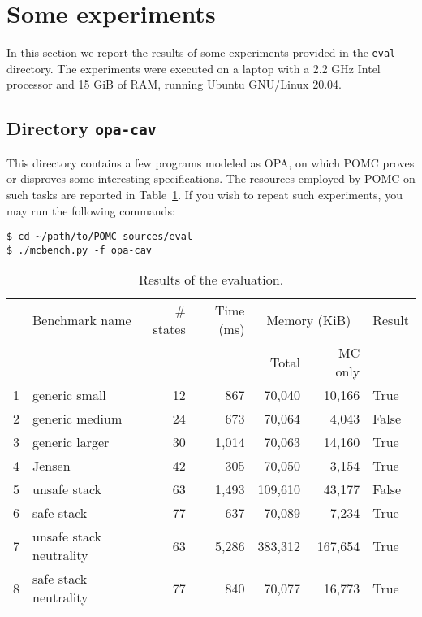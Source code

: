 \documentclass[9pt,a4paper]{article}
\begin{document}
\section{Some experiments}
\label{sec:exp}

In this section we report the results of some experiments
provided in the \texttt{eval} directory.
The experiments were executed on a laptop with a 2.2 GHz Intel processor
and 15 GiB of RAM, running Ubuntu GNU/Linux 20.04.


\subsection{Directory \texttt{opa-cav}}
\label{sec:exp-opa}

This directory contains a few programs modeled as OPA,
on which POMC proves or disproves some interesting specifications.
The resources employed by POMC on such tasks are reported in Table~\ref{tab:eval}.
If you wish to repeat such experiments, you may run the following
commands:
\begin{verbatim}
$ cd ~/path/to/POMC-sources/eval
$ ./mcbench.py -f opa-cav
\end{verbatim}

\begin{table}
  \centering
  \begin{tabular}{| r | l | r | r | r | r | l |}
    \hline
    & Benchmark name & \# states & Time (ms) & \multicolumn{2}{c|}{Memory (KiB)} & Result \\
    \cline{5-6}
    & & & & Total & MC only & \\
    \hline
    1 & generic small & 12 & 867 & 70,040 & 10,166 & True \\
    2 & generic medium & 24 & 673 & 70,064 & 4,043 & False \\
    3 & generic larger & 30 & 1,014 & 70,063 & 14,160 & True \\
    4 & Jensen & 42 & 305 & 70,050 & 3,154 & True \\
    5 & unsafe stack & 63 & 1,493 & 109,610 & 43,177 & False \\
    6 & safe stack & 77 & 637 & 70,089 & 7,234 & True \\
    7 & unsafe stack neutrality & 63 & 5,286 & 383,312 & 167,654 & True \\
    8 & safe stack neutrality & 77 & 840 & 70,077 & 16,773 & True \\
    \hline
  \end{tabular}
  \caption{Results of the evaluation.}
  \label{tab:eval}
\end{table}
\end{document}
